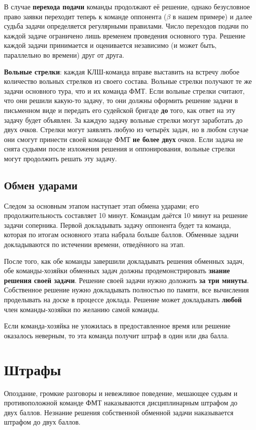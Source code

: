 \documentclass[12pt,a4paper]{article}
\begin{document}
В случае \textbf{перехода подачи} команды продолжают её решение, однако безусловное право заявки переходит теперь к команде оппонента ($\beta$ в нашем примере) и далее судьба задачи определяется регулярными правилами. Число переходов подачи по каждой задаче ограничено лишь временем проведения основного тура. Решение каждой задачи принимается и оценивается независимо (и может быть, параллельно во времени) друг от друга.

{\bf Вольные стрелки}: каждая КЛШ-команда вправе выставить на встречу любое количество вольных стрелков из своего состава. Вольные стрелки получают те же задачи основного тура, что и их команда ФМТ. Если вольные стрелки считают, что они решили какую-то задачу, то они должны оформить решение задачи в письменном виде и передать его судейской бригаде \textbf{до} того, как ответ на эту задачу будет объявлен. За каждую задачу вольные стрелки могут заработать до двух очков. Стрелки могут заявлять любую из четырёх задач, но в любом случае они смогут принести своей команде ФМТ \textbf{не более двух} очков. Если задача не снята судьями после изложения решения и оппонирования, вольные стрелки могут продолжить решать эту задачу.

\subsection{Обмен ударами}
Следом за основным этапом наступает этап обмена ударами; его продолжительность составляет 10 минут. Командам даётся 10 минут на решение задачи соперника. Первой докладывать задачу оппонента будет та команда, которая по итогам основного этапа набрала больше баллов. Обменные задачи докладываются по истечении времени, отведённого на этап.

После того, как обе команды завершили докладывать решения обменных задач, обе команды-хозяйки обменных задач должны продемонстрировать \textbf{знание решения своей задачи}. Решение своей задачи нужно доложить \textbf{за три минуты}. Собственное решение нужно докладывать полностью по памяти, все вычисления проделывать на доске в процессе доклада. Решение может докладывать {\bf любой} член команды-хозяйки по желанию самой команды.

Если команда-хозяйка не уложилась в предоставленное время или решение оказалось неверным, то эта команда получит штраф в один или два балла.

\section{Штрафы}
Опоздание, громкие разговоры и невежливое поведение, мешающее судьям и противоположной команде ФМТ наказываются дисциплинарным штрафом до двух баллов. Незнание решения собственной обменной задачи наказывается штрафом до двух баллов.
\end{document}
